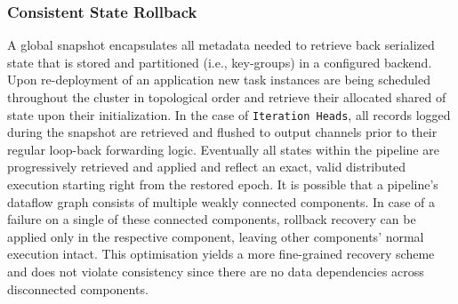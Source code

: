 
\subsubsection{Consistent State Rollback}
A global snapshot encapsulates all metadata needed to retrieve back serialized state that is stored and partitioned (i.e., key-groups) in a configured backend. Upon re-deployment of an application new task instances are being scheduled throughout the cluster in topological order and retrieve their allocated shared of state upon their initialization. In the case of  \texttt{Iteration Heads}, all records logged during the snapshot are retrieved and flushed to output channels prior to their regular loop-back forwarding logic. Eventually all states within the pipeline are progressively retrieved and applied and reflect an exact, valid distributed execution starting right from the restored epoch. It is possible that a pipeline's dataflow graph consists of multiple weakly connected components. In case of a failure on a single of these connected components, rollback recovery can be applied only in the respective component, leaving other components' normal execution intact. This optimisation yields a more fine-grained recovery scheme and does not violate consistency since there are no data dependencies across disconnected components. 

